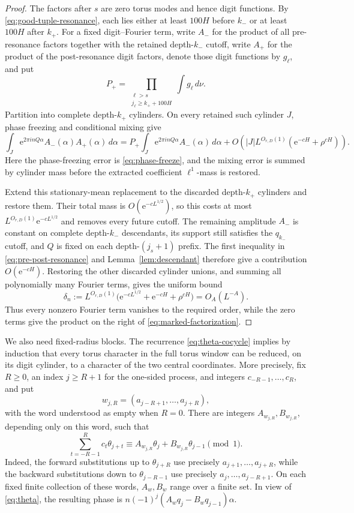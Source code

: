 \documentclass[11pt,a4paper]{amsart}
\theoremstyle{definition}
\theoremstyle{remark}
\newcommand{\e}{\mathrm e}
\begin{document}
\begin{proof}
The factors after $s$ are zero torus modes and hence digit functions.  By
\eqref{eq:good-tuple-resonance}, each lies either at least $100H$ before
$k_-$ or at least $100H$ after $k_+$.  For a fixed digit--Fourier term, write
$A_-$ for the product of all pre-resonance factors together with the retained
depth-$k_-$ cutoff, write $A_+$ for the product of the post-resonance digit
factors, denote those digit functions by $g_\ell$, and put
\[
 P_+=\prod_{\substack{\ell>s\\j_\ell\ge k_++100H}}
       \int g_\ell\,d\nu.
\]
Partition into complete depth-$k_+$ cylinders.  On every retained such
cylinder $J$, phase freezing and conditional mixing give
\[
 \int_J \e^{2\pi i nQ\alpha}A_-(\alpha)A_+(\alpha)\,d\alpha
 =P_+\int_J \e^{2\pi i nQ\alpha}A_-(\alpha)\,d\alpha
 +O\!\left(|J|L^{O_{r,D}(1)}
   (\e^{-cH}+\rho^{cH})\right).
\]
Here the phase-freezing error is \eqref{eq:phase-freeze}, and the mixing
error is summed by cylinder mass before the extracted coefficient
$\ell^1$-mass is restored.

Extend this stationary-mean replacement to the discarded depth-$k_+$
cylinders and restore them.  Their total mass is
$O(\e^{-cL^{1/2}})$, so this costs at most
$L^{O_{r,D}(1)}\e^{-cL^{1/2}}$ and removes every future cutoff.  The remaining
amplitude $A_-$ is constant on complete depth-$k_-$ descendants, its support
still satisfies the $q_{k_-}$ cutoff, and $Q$ is fixed on each
depth-$(j_s+1)$ prefix.  The first inequality in
\eqref{eq:pre-post-resonance} and Lemma~\ref{lem:descendant} therefore give a
contribution $O(\e^{-cH})$.  Restoring the other discarded cylinder unions,
and summing all polynomially many Fourier terms, gives the uniform bound
\begin{equation}\label{eq:delta-n}
 \delta_n:=L^{O_{r,D}(1)}
 \bigl(\e^{-cL^{1/2}}+\e^{-cH}+\rho^{cH}\bigr)=O_A(L^{-A}).
\end{equation}
Thus every nonzero Fourier term vanishes to the required order, while the
zero terms give the product on the right of
\eqref{eq:marked-factorization}.
\end{proof}

We also need fixed-radius blocks.  The recurrence
\eqref{eq:theta-cocycle} implies by induction that every torus character in
the full torus window can be reduced, on its digit cylinder, to a character
of the two central coordinates.  More precisely, fix $R\ge0$, an index
$j\ge R+1$ for the one-sided process, and integers
$c_{-R-1},\ldots,c_R$, and put
\[
 w_{j,R}=(a_{j-R+1},\ldots,a_{j+R}),
\]
with the word understood as empty when $R=0$.  There are integers
$A_{w_{j,R}},B_{w_{j,R}}$, depending only on this word, such that
\begin{equation}\label{eq:block-character-reduction}
 \sum_{t=-R-1}^{R}c_t\theta_{j+t}
 \equiv A_{w_{j,R}}\theta_j+B_{w_{j,R}}\theta_{j-1}\pmod1.
\end{equation}
Indeed, the forward substitutions up to $\theta_{j+R}$ use precisely
$a_{j+1},\ldots,a_{j+R}$, while the backward substitutions down to
$\theta_{j-R-1}$ use precisely $a_j,\ldots,a_{j-R+1}$.  On each fixed finite
collection of these words, $A_w,B_w$ range over a finite set.  In view of
\eqref{eq:theta}, the resulting phase is
$n(-1)^j(A_wq_j-B_wq_{j-1})\alpha$.
\end{document}
